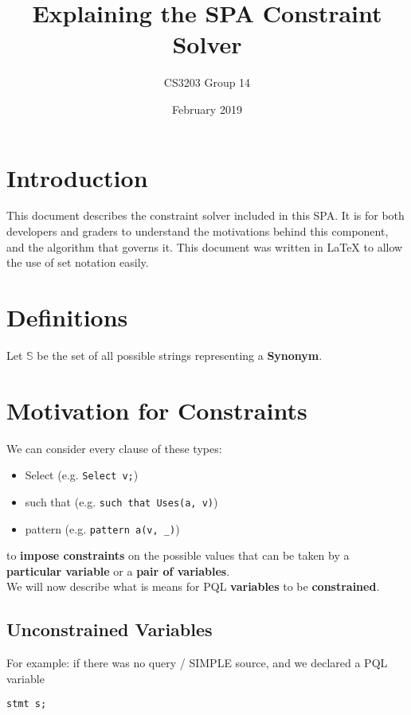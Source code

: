 \documentclass{article}
\title{Explaining the SPA Constraint Solver}
\author{CS3203 Group 14}
\date{February 2019}
\begin{document}
\maketitle
\tableofcontents

\newpage

\onehalfspace

\section{Introduction}
This document describes the constraint solver included in this SPA. It is for both developers and graders to understand the motivations behind this component, and the algorithm that governs it. This document was written in \LaTeX{} to allow the use of set notation easily.
\section{Definitions}
Let $\mathbb{S}$ be the set of all possible strings representing  a \textbf{Synonym}.

\section{Motivation for Constraints}
We can consider every clause of these types:
\begin{itemize}
    \item Select (e.g. \texttt{Select v;})
    \item such that (e.g. \texttt{such that Uses(a, v)})
    \item pattern (e.g. \texttt{pattern a(v, \_)})
\end{itemize}

to \textbf{impose constraints} on the possible values that can be taken by a \textbf{particular variable} or a \textbf{pair of variables}. \\

We will now describe what is means for PQL \textbf{variables} to be \textbf{constrained}. 

\subsection{Unconstrained Variables}
For example: if there was no query / SIMPLE source, and we declared a PQL variable

\begin{center}
\texttt{stmt s;}
\end{center}
\end{document}
